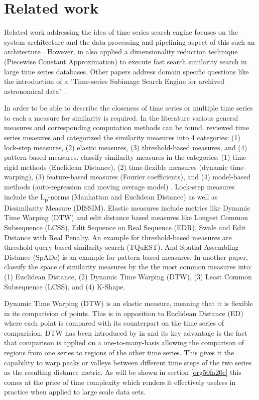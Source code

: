 \documentclass[phd,black, hidelinks]{PrincetonThesis}
\begin{document}
\chapter{Related work}
\label{sec:org28f0674}
\label{org8eba293}
Related work addressing the idea of time series search engine focuses on the system architecture and the data processing and pipelining aspect of this such an architecture \cite{Zhang_2012}. However, in \citeyear{Keogh_2000} \citeauthor{Keogh_2000} also applied a dimensionality reduction technique (Piecewise Constant Approximation) to execute fast search similarity search in  large time series databases. Other papers address domain specific questions like the introduction of a "Time-series Subimage Search Engine for archived astronomical data" \cite{Kang_2021}.

In order to be able to describe the closeness of time series or multiple time series to each a measure for similarity is required. In the literature various general measures and corresponding computation methods can be found. \citeauthor{Wang_2012} reviewed time series measures and categorized the similarity measures into 4 categories: (1) lock-step measures, (2) elastic measures, (3) threshold-based measures, and (4) pattern-based measures. \citeauthor{Zhang_2020} classify similarity measures in the categories: (1) time-rigid methods (Euclidean Distance), (2) time-flexible measures (dynamic time-warping), (3) feature-based measures (Fourier coefficients), and (4) model-based methods (auto-regression and moving average model) \cite{Zhang_2020}. Lock-step measures include the L\textsubscript{p}-norms (Manhattan and Euclidean Distance) as well as Dissimilarity Measure (DISSIM). Elastic measures include metrics like Dynamic Time Warping (DTW) and edit distance based measures like Longest Common Subsequence (LCSS), Edit Sequence on Real Sequence (EDR), Swale and Edit Distance with Real Penalty. An example for threshold-based measures are threshold query based similarity search (TQuEST). And Spatial Assembling Distance (SpADe) is an example for pattern-based measures. In another paper, \citeauthor{Gharghabi_2020} classify the space of similarity measures by the the most common measures into: (1) Euclidean Distance, (2) Dynamic Time Warping (DTW), (3) Least Common Subsequence (LCSS), and (4) K-Shape.

Dynamic Time Warping (DTW) is an elastic measure, meaning that it is flexible in its comparision of points. This is in opposition to Euclidean Distance (ED) where each point is compared with its counterpart on the time series of comparision. DTW has been introduced by \citeauthor{Berndt94usingdynamic} in \citeyear{Berndt94usingdynamic} and its key advantage is the fact that comparison is applied on a one-to-many-basis allowing the comparison of regions from one series to regions of the other time series. This gives it the capability to warp peaks or valleys between different time steps of the two series as the resulting distance metric. As will be shown in section \ref{org50fa20e} this comes at the price of time complexity which renders it effectively useless in practice when applied to large scale data sets.
\end{document}
